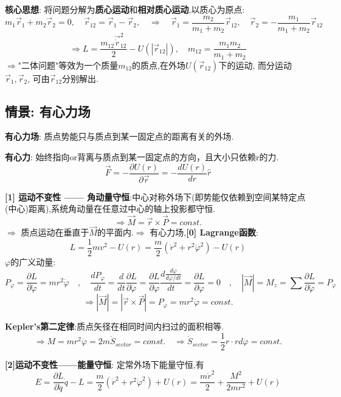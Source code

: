 \documentclass{article}
\begin{document}
        \textbf{核心思想}: 将问题分解为\textbf{质心运动}和\textbf{相对质心运动},以质心为原点:
            $$m_1\vec r_1 + m_2 \vec r_2 =0,\quad \vec r_{12} = \vec r_1 - \vec r_2, \quad \Rightarrow \quad \vec r_1 = \frac{m_2}{m_1 + m_2}\vec r_{12}, \quad \vec r_2 = - \frac{m_1}{m_1 + m_2}\vec r_{12} $$
            $$\Rightarrow L = \frac{m_{12} \vec \dot r_{12}^2}{2} - U(|\vec r_{12}|), \quad m_{12} = \frac{m_1 m_2}{m_1 + m_2}$$
            $\Rightarrow$"二体问题"等效为一个质量$m_{12}$的质点,在外场$U(\vec r_{12})$下的运动, 而分运动$\vec r_1, \vec r_2$, 可由$\vec r_{12}$分别解出.
        
        
    \subsection{情景: 有心力场}
        \textbf{有心力场}: 质点势能只与质点到某一固定点的距离有关的外场.
        
        \textbf{有心力}: 始终指向or背离与质点到某一固定点的方向，且大小只依赖r的力.
            $$\vec F = -\frac{\partial U(r)}{\partial \vec r} = -\frac{d U(r)}{d r} \hat r$$
    
        \textbf{[1] 运动不变性 —— 角动量守恒}:中心对称外场下(即势能仅依赖到空间某特定点(中心)距离),系统角动量在任意过中心的轴上投影都守恒.
            $$\Rightarrow \vec M = \vec r \times \vec P = const.$$
            $\Rightarrow$ 质点运动在垂直于$\vec M$的平面内.\quad $\Rightarrow$ 有心力场,\textbf{[0] Lagrange函数}:
            $$L = \frac{1}{2}m v^2 - U(r) = \frac{m}{2} (\dot r^2 + r^2 \dot \varphi ^2) - U(r)$$
            $\varphi$的广义动量:
            $$P_\varphi = \frac{\partial L}{\partial \dot \varphi} = m r^2 \dot \varphi \quad , \quad \frac{d P_\varphi}{d t} = \frac{d}{d t}\frac{\partial L}{\partial \dot \varphi} = \frac{\partial L}{\partial \varphi} \frac{d \frac{d \varphi}{d \varphi / d t}}{d t} = \frac{\partial L}{\partial \varphi} = 0 \quad , \quad |\vec M| = M_z = \sum \frac{\partial L}{\partial  \dot \varphi} = P_\varphi$$
            $$\Rightarrow |\vec M| =| \vec r \times \vec P |= P_\varphi = m r^2 \dot \varphi = const.$$
    
        \textbf{Kepler's第二定律}:质点矢径在相同时间内扫过的面积相等.
            $$\Rightarrow M = m r^2 \dot \varphi = 2 m \dot S_{sector} = const.\quad \Rightarrow \dot S_{sector} = \frac{1}{2} r \cdot r d\varphi = const.$$
    
        \textbf{[2]运动不变性——能量守恒}: 定常外场下能量守恒,有
            $$E = \frac{\partial L}{\partial \dot q}\dot q - L = \frac{m}{2} (\dot r^2 + r^2 \dot \varphi ^2) + U(r) = \frac{m \dot r^2}{2} + \frac{M^2}{2mr^2} + U(r)$$
    
\end{document}
